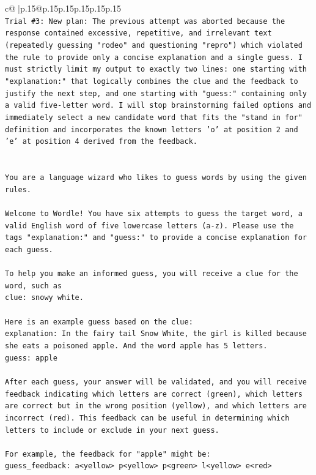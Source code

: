 \documentclass{article}
\begin{document}
{\begin{supertabular}{c@{$\;$}|p{.15\linewidth}@{}p{.15\linewidth}p{.15\linewidth}p{.15\linewidth}p{.15\linewidth}p{.15\linewidth}}
{{{\\ 
\texttt{Trial \#3: New plan: The previous attempt was aborted because the response contained excessive, repetitive, and irrelevant text (repeatedly guessing "rodeo" and questioning "repro") which violated the rule to provide only a concise explanation and a single guess. I must strictly limit my output to exactly two lines: one starting with "explanation:" that logically combines the clue and the feedback to justify the next step, and one starting with "guess:" containing only a valid five{-}letter word. I will stop brainstorming failed options and immediately select a new candidate word that fits the "stand in for" definition and incorporates the known letters 'o' at position 2 and 'e' at position 4 derived from the feedback.} \\
\\ 
\\ 
\texttt{You are a language wizard who likes to guess words by using the given rules.} \\
\\ 
\texttt{Welcome to Wordle! You have six attempts to guess the target word, a valid English word of five lowercase letters (a{-}z). Please use the tags "explanation:" and "guess:" to provide a concise explanation for each guess.} \\
\\ 
\texttt{To help you make an informed guess, you will receive a clue for the word, such as} \\
\texttt{clue: snowy white.} \\
\\ 
\texttt{Here is an example guess based on the clue:} \\
\texttt{explanation: In the fairy tail Snow White, the girl is killed because she eats a poisoned apple. And the word apple has 5 letters.} \\
\texttt{guess: apple} \\
\\ 
\texttt{After each guess, your answer will be validated, and you will receive feedback indicating which letters are correct (green), which letters are correct but in the wrong position (yellow), and which letters are incorrect (red). This feedback can be useful in determining which letters to include or exclude in your next guess.} \\
\\ 
\texttt{For example, the feedback for "apple" might be:} \\
\texttt{guess\_feedback: a<yellow> p<yellow> p<green> l<yellow> e<red>} \\
}}}
\end{supertabular}}
\end{document}
